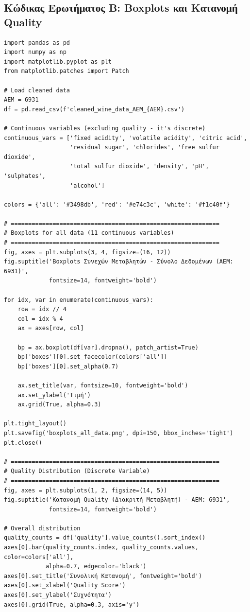 \documentclass[12pt,a4paper]{article}
\begin{document}
\subsection{Κώδικας Ερωτήματος Β: Boxplots και Κατανομή Quality}

\begin{lstlisting}
import pandas as pd
import numpy as np
import matplotlib.pyplot as plt
from matplotlib.patches import Patch

# Load cleaned data
AEM = 6931
df = pd.read_csv(f'cleaned_wine_data_AEM_{AEM}.csv')

# Continuous variables (excluding quality - it's discrete)
continuous_vars = ['fixed acidity', 'volatile acidity', 'citric acid',
                   'residual sugar', 'chlorides', 'free sulfur dioxide',
                   'total sulfur dioxide', 'density', 'pH', 'sulphates',
                   'alcohol']

colors = {'all': '#3498db', 'red': '#e74c3c', 'white': '#f1c40f'}

# ============================================================
# Boxplots for all data (11 continuous variables)
# ============================================================
fig, axes = plt.subplots(3, 4, figsize=(16, 12))
fig.suptitle('Boxplots Συνεχών Μεταβλητών - Σύνολο Δεδομένων (ΑΕΜ: 6931)',
             fontsize=14, fontweight='bold')

for idx, var in enumerate(continuous_vars):
    row = idx // 4
    col = idx % 4
    ax = axes[row, col]

    bp = ax.boxplot(df[var].dropna(), patch_artist=True)
    bp['boxes'][0].set_facecolor(colors['all'])
    bp['boxes'][0].set_alpha(0.7)

    ax.set_title(var, fontsize=10, fontweight='bold')
    ax.set_ylabel('Τιμή')
    ax.grid(True, alpha=0.3)

plt.tight_layout()
plt.savefig('boxplots_all_data.png', dpi=150, bbox_inches='tight')
plt.close()

# ============================================================
# Quality Distribution (Discrete Variable)
# ============================================================
fig, axes = plt.subplots(1, 2, figsize=(14, 5))
fig.suptitle('Κατανομή Quality (Διακριτή Μεταβλητή) - ΑΕΜ: 6931', 
             fontsize=14, fontweight='bold')

# Overall distribution
quality_counts = df['quality'].value_counts().sort_index()
axes[0].bar(quality_counts.index, quality_counts.values, color=colors['all'], 
            alpha=0.7, edgecolor='black')
axes[0].set_title('Συνολική Κατανομή', fontweight='bold')
axes[0].set_xlabel('Quality Score')
axes[0].set_ylabel('Συχνότητα')
axes[0].grid(True, alpha=0.3, axis='y')


\end{lstlisting}
\end{document}
